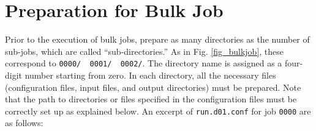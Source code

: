 \section{Preparation for Bulk Job}
Prior to the execution of bulk jobs, prepare as many directories as the number of sub-jobs, which are called ``sub-directories.'' As in Fig. \ref{fig_bulkjob}, these correspond to \verb|0000/  0001/  0002/|. The directory name is assigned as a four-digit number starting from zero. In each directory, all the necessary files (configuration files, input files, and output directories) must be prepared.
Note that the path to directories or files specified in the configuration files must be correctly set up as explained below.
An excerpt of \verb|run.d01.conf| for job \verb|0000| are as follows:

